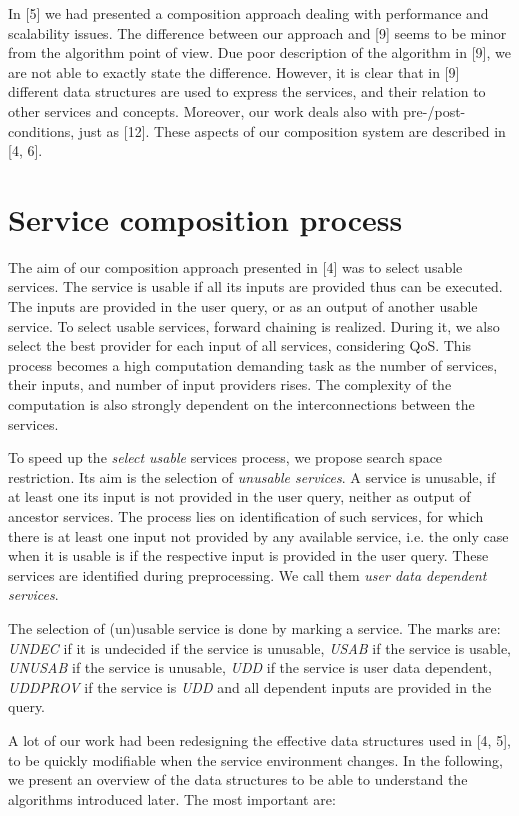 \documentclass[11pt]{llncs}
\begin{document}
In [5] we had presented a composition approach dealing with performance and
scalability issues. The difference between our approach and [9] seems to be minor
from the algorithm point of view. Due poor description of the algorithm in [9], we
are not able to exactly state the difference. However, it is clear that in [9] different
data structures are used to express the services, and their relation to other services
and concepts. Moreover, our work deals also with pre-/post-conditions, just as [12].
These aspects of our composition system are described in [4, 6].

\section{Service composition process}

The aim of our composition approach presented in [4] was to select usable services.
The service is usable if all its inputs are provided thus can be executed. The inputs
are provided in the user query, or as an output of another usable service. To
select usable services, forward chaining is realized. During it, we also select the
best provider for each input of all services, considering QoS. This process becomes
a high computation demanding task as the number of services, their inputs, and
number of input providers rises. The complexity of the computation is also strongly
dependent on the interconnections between the services.

To speed up the \emph{select usable} services process, we propose search space restriction.
Its aim is the selection  of \emph{unusable services}. A service is unusable, if at least
one its input is not provided in the user query, neither as output of ancestor services.
The process lies on identification of such services, for which there is at least one
input not provided by any available service, i.e. the only case when it is usable is
if the respective input is provided in the user query. These services are identified
during preprocessing. We call them \emph{user data dependent services}.

The selection of (un)usable service is done by marking a service. The marks are:
\emph{UNDEC} if it is undecided if the service is unusable, \emph{USAB} if the service is usable,
\emph{UNUSAB} if the service is unusable, \emph{UDD} if the service is user data dependent,
\emph{UDDPROV} if the service is \emph{UDD} and all dependent inputs are provided in the query.

A lot of our work had been redesigning the effective data structures used in [4, 5],
to be quickly modifiable when the service environment changes. In the following,
we present an overview of the data structures to be able to understand the algorithms
introduced later. The most important are:
\end{document}
